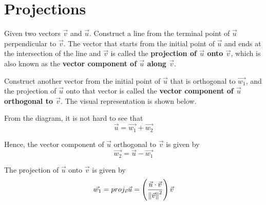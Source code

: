 \chapter{Projections}

Given two vectors $\vec{v}$ and $\vec{u}$. Construct a line from the terminal
point of $\vec{u}$ perpendicular to $\vec{v}$. The vector that starts from the
initial point of $\vec{u}$ and ends at the intersection of the line and
$\vec{v}$ is called the \textbf{projection of $\vec{u}$ onto $\vec{v}$}, which
is also known as the \textbf{vector component of $\vec{u}$ along $\vec{v}$}.

Construct another vector from the initial point of $\vec{u}$ that is orthogonal
to $\vec{w_1}$, and the projection of $\vec{u}$ onto that vector is called the
\textbf{vector component of $\vec{u}$ orthogonal to $\vec{v}$}. The visual
representation is shown below.
\begin{center}
\end{center}

From the diagram, it is not hard to see that \[\vec{u} = \vec{w_1} + \vec{w_2}\]

Hence, the vector component of $\vec{u}$ orthogonal to $\vec{v}$ is given by \[\vec{w_2} = \vec{u} - \vec{w_1}\]

The projection of $\vec{u}$ onto $\vec{v}$ is given by \[\vec{w_1} = proj_{\vec{v}}\vec{u} = \left(\frac{\vec{u} \cdot \vec{v}}{\left\lVert\vec{v}\right\rVert^2}\right)\vec{v}\]

